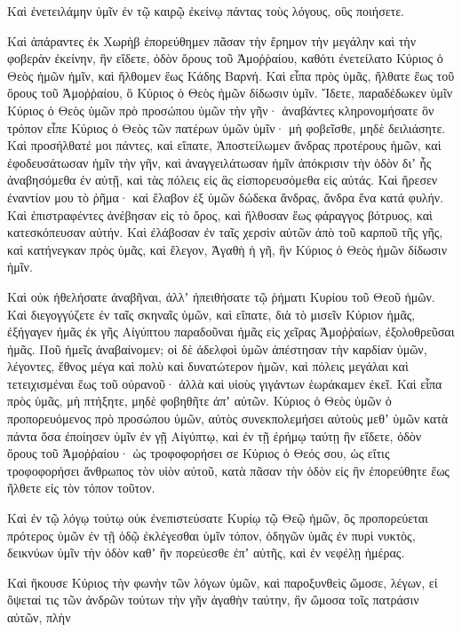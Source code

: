 {Καὶ ἐνετειλάμην ὑμῖν ἐν τῷ καιρῷ ἐκείνῳ πάντας τοὺς λόγους, οὓς ποιήσετε.
\par }{\PP {}Καὶ ἀπάραντες ἐκ Χωρὴβ ἐπορεύθημεν πᾶσαν τὴν ἔρημον τὴν μεγάλην καὶ τὴν φοβερὰν ἐκείνην, ἣν εἴδετε, ὁδὸν ὄρους τοῦ Ἀμοῤῥαίου, καθότι ἐνετείλατο Κύριος ὁ Θεὸς ἡμῶν ἡμῖν, καὶ ἤλθομεν ἕως Κάδης Βαρνή.
Καὶ εἶπα πρὸς ὑμᾶς, ἤλθατε ἕως τοῦ ὄρους τοῦ Ἀμοῤῥαίου, ὃ Κύριος ὁ Θεὸς ἡμῶν δίδωσιν ὑμῖν.
Ἴδετε, παραδέδωκεν ὑμῖν Κύριος ὁ Θεὸς ὑμῶν πρὸ προσώπου ὑμῶν τὴν γῆν· ἀναβάντες κληρονομήσατε ὃν τρόπον εἶπε Κύριος ὁ Θεὸς τῶν πατέρων ὑμῶν ὑμῖν· μὴ φοβεῖσθε, μηδὲ δειλιάσητε.
Καὶ προσήλθατέ μοι πάντες, καὶ εἴπατε, Ἀποστείλωμεν ἄνδρας προτέρους ἡμῶν, καὶ ἐφοδευσάτωσαν ἡμῖν τὴν γῆν, καὶ ἀναγγειλάτωσαν ἡμῖν ἀπόκρισιν τὴν ὁδὸν διʼ ἧς ἀναβησόμεθα ἐν αὐτῇ, καὶ τὰς πόλεις εἰς ἃς εἰσπορευσόμεθα εἰς αὐτάς.
Καὶ ἤρεσεν ἐναντίον μου τὸ ῥῆμα· καὶ ἔλαβον ἐξ ὑμῶν δώδεκα ἄνδρας, ἄνδρα ἕνα κατά φυλήν.
Καὶ ἐπιστραφέντες ἀνέβησαν εἰς τὸ ὄρος, καὶ ἤλθοσαν ἕως φάραγγος βότρυος, καὶ κατεσκόπευσαν αὐτήν.
Καὶ ἐλάβοσαν ἐν ταῖς χερσὶν αὐτῶν ἀπὸ τοῦ καρποῦ τῆς γῆς, καὶ κατήνεγκαν πρὸς ὑμᾶς, καὶ ἔλεγον, Ἀγαθὴ ἡ γῆ, ἣν Κύριος ὁ Θεὸς ἡμῶν δίδωσιν ἡμῖν.
\par }{\PP {}Καὶ οὐκ ἠθελήσατε ἀναβῆναι, ἀλλʼ ἠπειθήσατε τῷ ῥήματι Κυρίου τοῦ Θεοῦ ἡμῶν.
Καὶ διεγογγύζετε ἐν ταῖς σκηναῖς ὑμῶν, καὶ εἴπατε, διὰ τὸ μισεῖν Κύριον ἡμᾶς, ἐξήγαγεν ἡμᾶς ἐκ γῆς Αἰγύπτου παραδοῦναι ἡμᾶς εἰς χεῖρας Ἀμοῤῥαίων, ἐξολοθρεῦσαι ἡμᾶς.
Ποῦ ἡμεῖς ἀναβαίνομεν; οἱ δὲ ἀδελφοὶ ὑμῶν ἀπέστησαν τὴν καρδίαν ὑμῶν, λέγοντες, ἔθνος μέγα καὶ πολὺ καὶ δυνατώτερον ἡμῶν, καὶ πόλεις μεγάλαι καὶ τετειχισμέναι ἕως τοῦ οὐρανοῦ· ἀλλὰ καὶ υἱοὺς γιγάντων ἑωράκαμεν ἐκεῖ.
Καὶ εἶπα πρὸς ὑμᾶς, μὴ πτήξητε, μηδὲ φοβηθῆτε ἀπʼ αὐτῶν.
Κύριος ὁ Θεὸς ὑμῶν ὁ προπορευόμενος πρὸ προσώπου ὑμῶν, αὐτὸς συνεκπολεμήσει αὐτοὺς μεθʼ ὑμῶν κατὰ πάντα ὅσα ἐποίησεν ὑμῖν ἐν γῇ Αἰγύπτῳ, καὶ ἐν τῇ ἐρήμῳ ταύτῃ ἣν εἴδετε, ὁδὸν ὄρους τοῦ Ἀμοῤῥαίου· ὡς τροφοφορήσει σε Κύριος ὁ
Θεός σου, ὡς εἴτις τροφοφορήσει ἄνθρωπος τὸν υἱὸν αὐτοῦ, κατὰ πᾶσαν τὴν ὁδὸν εἰς ἣν ἐπορεύθητε ἕως ῆλθετε εἰς τὸν τόπον τοῦτον.
\par }{\PP {}Καὶ ἐν τῷ λόγῳ τούτῳ οὐκ ἐνεπιστεύσατε Κυρίῳ τῷ Θεῷ ἡμῶν,
ὃς προπορεύεται πρότερος ὑμῶν ἐν τῇ ὁδῷ ἐκλέγεσθαι ὑμῖν τόπον, ὁδηγῶν ὑμᾶς ἐν πυρὶ νυκτὸς, δεικνύων ὑμῖν τὴν ὁδὸν καθʼ ἣν πορεύεσθε ἐπʼ αὐτῆς, καὶ ἐν νεφέλῃ ἡμέρας.
\par }{\PP {}Καὶ ἤκουσε Κύριος τὴν φωνὴν τῶν λόγων ὑμῶν, καὶ παροξυνθεὶς ὤμοσε, λέγων,
εἰ ὄψεταί τις τῶν ἀνδρῶν τούτων τὴν γῆν ἀγαθὴν ταύτην, ἣν ὤμοσα τοῖς πατράσιν αὐτῶν, πλὴν
}
